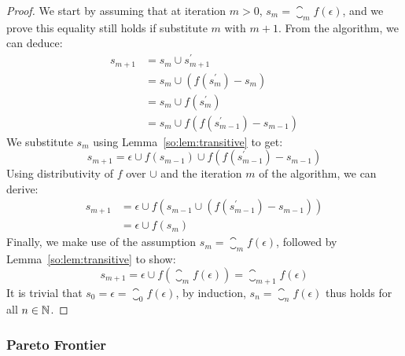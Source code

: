 \begin{proof}
    We start by assuming that at iteration $m > 0$, $s_m = \closure_m
    f(\epsilon)$, and we prove this equality still holds if substitute $m$ with
    $m + 1$.  From the algorithm, we can deduce:
    \begin{equation*}
    \begin{aligned}
        s_{m+1}
         &= s_m \cup s^\prime_{m+1} \\
         &= s_m \cup \left( f \left( s^\prime_m \right) - s_m \right) \\
         &= s_m \cup f \left( s^\prime_m \right) \\
         &= s_m \cup f \left(
                f \left( s^\prime_{m-1} \right) - s_{m-1}
            \right)
    \end{aligned}
    \end{equation*}
    We substitute $s_m$ using Lemma~\ref{so:lem:transitive} to get:
    \begin{equation*}
        s_{m+1}
          = \epsilon \cup f \left( s_{m-1} \right) \cup
            f \left(
                f \left( s^\prime_{m-1} \right) - s_{m-1}
            \right)
    \end{equation*}
    Using distributivity of $f$ over $\cup$ and the iteration $m$ of the
    algorithm, we can derive:
    \begin{equation*}
    \begin{aligned}
        s_{m+1}
         &= \epsilon \cup f \left(
                s_{m-1} \cup \left(
                    f \left( s^\prime_{m-1} \right) - s_{m-1}
                \right)
            \right) \\
         &= \epsilon \cup f \left( s_m \right)
    \end{aligned}
    \end{equation*}
    Finally, we make use of the assumption $s_m = \closure_m f(\epsilon)$,
    followed by Lemma~\ref{so:lem:transitive} to show:
    \begin{equation*}
        s_{m+1}
        = \epsilon \cup f \left(
            \closure_m f(\epsilon)
        \right)
        = \closure_{m+1} f(\epsilon)
    \end{equation*}
    It is trivial that $s_0 = \epsilon = \closure_0 f(\epsilon)$, by induction,
    $s_n = \closure_n f(\epsilon)$ thus holds for all $n \in \mathbb{N}$.
\end{proof}


\subsubsection{Pareto Frontier}

